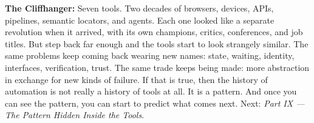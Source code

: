 \documentclass[11pt, a4paper, openany]{book}
\begin{document}
\noindent \textbf{The Cliffhanger:} Seven tools. Two decades of browsers, devices, APIs, pipelines, semantic locators, and agents. Each one looked like a separate revolution when it arrived, with its own champions, critics, conferences, and job titles. But step back far enough and the tools start to look strangely similar. The same problems keep coming back wearing new names: state, waiting, identity, interfaces, verification, trust. The same trade keeps being made: more abstraction in exchange for new kinds of failure. If that is true, then the history of automation is not really a history of tools at all. It is a pattern. And once you can see the pattern, you can start to predict what comes next. Next: \textit{Part IX --- The Pattern Hidden Inside the Tools}.
\end{document}
